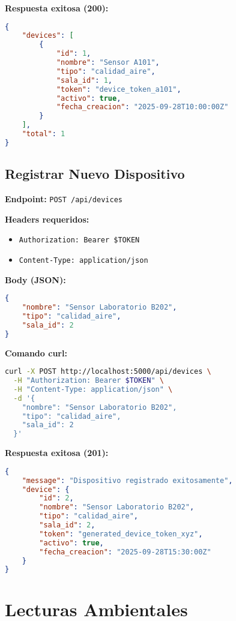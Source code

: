 \documentclass[12pt,a4paper]{article}
\begin{document}
\textbf{Respuesta exitosa (200):}
\begin{lstlisting}[language=JSON]
{
    "devices": [
        {
            "id": 1,
            "nombre": "Sensor A101",
            "tipo": "calidad_aire",
            "sala_id": 1,
            "token": "device_token_a101",
            "activo": true,
            "fecha_creacion": "2025-09-28T10:00:00Z"
        }
    ],
    "total": 1
}
\end{lstlisting}

\subsection{Registrar Nuevo Dispositivo}

\textbf{Endpoint:} \texttt{POST /api/devices}

\textbf{Headers requeridos:}
\begin{itemize}
\item \texttt{Authorization: Bearer \$TOKEN}
\item \texttt{Content-Type: application/json}
\end{itemize}

\textbf{Body (JSON):}
\begin{lstlisting}[language=JSON]
{
    "nombre": "Sensor Laboratorio B202",
    "tipo": "calidad_aire",
    "sala_id": 2
}
\end{lstlisting}

\textbf{Comando curl:}
\begin{lstlisting}[language=bash]
curl -X POST http://localhost:5000/api/devices \
  -H "Authorization: Bearer $TOKEN" \
  -H "Content-Type: application/json" \
  -d '{
    "nombre": "Sensor Laboratorio B202",
    "tipo": "calidad_aire",
    "sala_id": 2
  }'
\end{lstlisting}

\textbf{Respuesta exitosa (201):}
\begin{lstlisting}[language=JSON]
{
    "message": "Dispositivo registrado exitosamente",
    "device": {
        "id": 2,
        "nombre": "Sensor Laboratorio B202",
        "tipo": "calidad_aire",
        "sala_id": 2,
        "token": "generated_device_token_xyz",
        "activo": true,
        "fecha_creacion": "2025-09-28T15:30:00Z"
    }
}
\end{lstlisting}

\section{Lecturas Ambientales}
\end{document}
